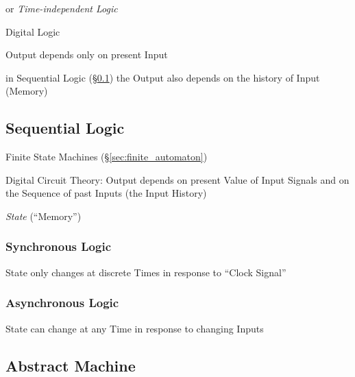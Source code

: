 or \emph{Time-independent Logic}

Digital Logic

Output depends only on present Input

in Sequential Logic (\S\ref{sec:sequential_logic}) the Output also
depends on the history of Input (Memory)




\subsection{Sequential Logic}\label{sec:sequential_logic}


Finite State Machines (\S\ref{sec:finite_automaton})

Digital Circuit Theory: Output depends on present Value of Input
Signals and on the Sequence of past Inputs (the Input History)

\emph{State} (``Memory'')



\subsubsection{Synchronous Logic}\label{sec:synchronous_logic}

State only changes at discrete Times in response to ``Clock Signal''



\subsubsection{Asynchronous Logic}\label{sec:asynchronous_logic}

State can change at any Time in response to changing Inputs



\subsection{Abstract Machine} \label{sec:abstract_machine}

